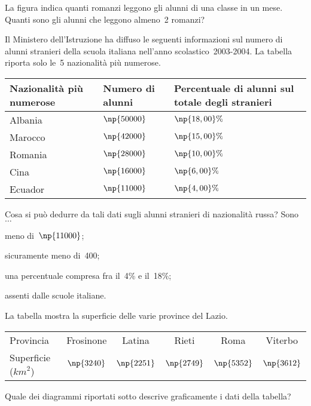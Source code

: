 \begin{esercizio}
\label{ese:A.57}
La figura indica quanti romanzi leggono gli alunni di una classe in un mese. Quanti sono gli alunni che leggono almeno~2 romanzi?
\begin{center}
 
\end{center}
\end{esercizio}
\pagebreak
\begin{esercizio}
\label{ese:A.58}
Il Ministero dell'Istruzione ha diffuso le seguenti informazioni sul numero di alunni stranieri della scuola italiana
nell'anno scolastico~2003-2004. La tabella riporta solo le~5 nazionalità più numerose.
\begin{center}
 \begin{tabularx}{.95\textwidth}{*{3}{X}}
\toprule
Nazionalità più numerose & Numero di alunni & Percentuale di alunni sul totale degli stranieri \\
\midrule
Albania & $\np{50000}$ & $\np{18,00}\%$ \\
Marocco & $\np{42000}$ & $\np{15,00}\%$ \\
Romania & $\np{28000}$ & $\np{10,00}\%$ \\
Cina    & $\np{16000}$ & $\np{6,00}\%$ \\
Ecuador & $\np{11000}$ & $\np{4,00}\%$ \\
\bottomrule
\end{tabularx}
\end{center}

Cosa si può dedurre da tali dati sugli alunni stranieri di nazionalità russa? Sono~$\ldots$
\begin{enumeratea}
 \item meno di~$\np{11000}$;
 \item sicuramente meno di~400;
 \item una percentuale compresa fra il~4\% e il~18\%;
 \item assenti dalle scuole italiane.
\end{enumeratea}
\end{esercizio}
\begin{esercizio}
\label{ese:A.59}
La tabella mostra la superficie delle varie province del Lazio.
\begin{center}
 \begin{tabular}{l*{5}{c}}
 \toprule
 Provincia & Frosinone & Latina & Rieti & Roma & Viterbo\\
 Superficie ($\unit{km}^2$) & $\np{3240}$& $\np{2251}$& $\np{2749}$& $\np{5352}$& $\np{3612}$\\
 \bottomrule
 \end{tabular}
\end{center}
Quale dei diagrammi riportati sotto descrive graficamente i dati della tabella?
\begin{center}
 
\end{center}

\end{esercizio}

